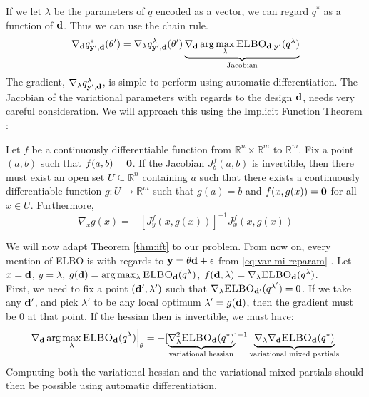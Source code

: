 If we let $\lambda$ be the parameters of $q$ encoded as a vector, we can regard $q^*$ as a function of $\mathbf{d}$.
Thus we can use the chain rule.
\begin{equation}
  \nabla_{\mathbf{d}} q^*_{\mathbf{y}', \mathbf{d}}(\theta') = \nabla_\lambda q^{\lambda}_{\mathbf{y}', \mathbf{d}}(\theta')\underbrace{\nabla_{\mathbf{d}} \arg \max_\lambda \textsc{ELBO}_{\mathbf{d}, \mathbf{y}'}(q^\lambda)}_{\textrm{Jacobian}}
\end{equation}
The gradient, $\nabla_\lambda q^\lambda_{\mathbf{y}',\mathbf{d}}$, is simple to perform using automatic differentiation.
The Jacobian of the variational parameters with regards to the design $\mathbf{d}$, needs very careful consideration. 
We will approach this using the Implicit Function Theorem \cite{lorraine19}:
\begin{theorem}
  Let $f$ be a continuously differentiable function from $\mathbb{R}^n \times \mathbb{R}^m$ to $\mathbb{R}^m$.
  Fix a point $(a, b)$ such that $f(a, b) = \mathbf{0}$. 
  If the Jacobian $J_b^{f}(a, b)$ is invertible, then there must exist an open set $U \subseteq \mathbb{R}^n$ containing $a$
  such that there exists a continuously differentiable function $g: U \rightarrow \mathbb{R}^m$ such that $g(a) = b$ and $f(x, g(x)) = \mathbf{0}$ for all $x \in U$.
  Furthermore,
  $$\nabla_{x}g(x) = -[J_y^f(x, g(x))]^{-1}J_{x}^{f}(x, g(x))$$
  \label{thm:ift}
\end{theorem}
We will now adapt Theorem \ref{thm:ift} to our problem. 
From now on, every mention of ELBO is with regards to $\mathbf{y} = \theta \mathbf{d} + \epsilon$ from \eqref{eq:var-mi-reparam} .
Let $x=\mathbf{d}$, $y=\lambda$, $g(\mathbf{d}) = \arg \max_{\lambda} \textsc{ELBO}_{\mathbf{d}}(q^{\lambda})$, $f(\mathbf{d}, \lambda) = \nabla_{\lambda}\textsc{ELBO}_{\mathbf{d}}(q^{\lambda})$.
\\
First, we need to fix a point $(\mathbf{d}', \lambda')$ such that $\nabla_{\lambda}\textsc{ELBO}_{\mathbf{d}'}(q^{\lambda'}) = 0$.
If we take any $\mathbf{d}'$, and pick $\lambda'$ to be any local optimum $\lambda' = g(\mathbf{d})$, then the gradient must be $0$ at that point.
If the hessian then is invertible, we must have:
\begin{equation}
  \nabla_{\mathbf{d}} \arg \max_{\lambda} \textsc{ELBO}_{\mathbf{d}}(q^{\lambda})\Bigr\rvert_{\theta}= 
  -[\underbrace{\nabla^2_{\lambda} \textsc{ELBO}_{\mathbf{d}}(q^*)}_{\textrm{variational hessian}}]^{-1}
  \underbrace{\nabla_{\lambda}\nabla_{\mathbf{d}}\textsc{ELBO}_{\mathbf{d}}(q^*)}_{\textrm{variational mixed partials}}
  \label{eq:variational-jacobian}
\end{equation}
Computing both the variational hessian and the variational mixed partials should then be possible using automatic differentiation.
